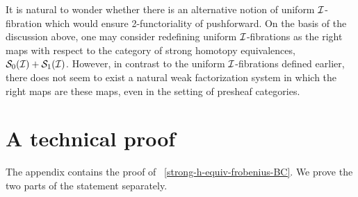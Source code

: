 \documentclass[reqno,10pt,a4paper,oneside,draft]{amsart}
\begin{document}
\begin{remark}[2-functoriality]
It is natural to wonder whether there is an alternative notion of uniform $\cal{I}$-fibration which would ensure 2-functoriality of pushforward. 
On the basis of the discussion above, one may consider redefining uniform $\cal{I}$-fibrations as the right maps with respect to 
the category of strong homotopy equivalences, $\cal{S}_0(\cal{I}) + \cal{S}_1(\cal{I})$.
However, in contrast to the uniform $\cal{I}$-fibrations defined earlier, there does not seem to exist  a natural weak factorization system
in which the right maps are these maps, even in the setting of presheaf categories.
\end{remark}


\appendix

\section{A technical proof}
\label{app:tecp}

The appendix contains the proof of ~\cref{strong-h-equiv-frobenius-BC}. We prove the two parts of the statement separately.
\end{document}
